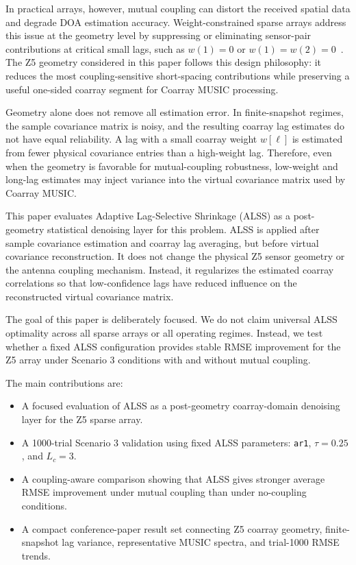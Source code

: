 \documentclass[conference]{IEEEtran}
\begin{document}
In practical arrays, however, mutual coupling can distort the received spatial data and degrade DOA estimation accuracy. Weight-constrained sparse arrays address this issue at the geometry level by suppressing or eliminating sensor-pair contributions at critical small lags, such as $w(1)=0$ or $w(1)=w(2)=0$~\cite{kulkarni2024wcsa}. The Z5 geometry considered in this paper follows this design philosophy: it reduces the most coupling-sensitive short-spacing contributions while preserving a useful one-sided coarray segment for Coarray MUSIC processing.

Geometry alone does not remove all estimation error. In finite-snapshot regimes, the sample covariance matrix is noisy, and the resulting coarray lag estimates do not have equal reliability. A lag with a small coarray weight $w[\ell]$ is estimated from fewer physical covariance entries than a high-weight lag. Therefore, even when the geometry is favorable for mutual-coupling robustness, low-weight and long-lag estimates may inject variance into the virtual covariance matrix used by Coarray MUSIC.

This paper evaluates Adaptive Lag-Selective Shrinkage (ALSS) as a post-geometry statistical denoising layer for this problem. ALSS is applied after sample covariance estimation and coarray lag averaging, but before virtual covariance reconstruction. It does not change the physical Z5 sensor geometry or the antenna coupling mechanism. Instead, it regularizes the estimated coarray correlations so that low-confidence lags have reduced influence on the reconstructed virtual covariance matrix.

The goal of this paper is deliberately focused. We do not claim universal ALSS optimality across all sparse arrays or all operating regimes. Instead, we test whether a fixed ALSS configuration provides stable RMSE improvement for the Z5 array under Scenario 3 conditions with and without mutual coupling.

The main contributions are:
\begin{itemize}
    \item A focused evaluation of ALSS as a post-geometry coarray-domain denoising layer for the Z5 sparse array.
    \item A 1000-trial Scenario 3 validation using fixed ALSS parameters: \texttt{ar1}, $\tau=0.25$, and $L_c=3$.
    \item A coupling-aware comparison showing that ALSS gives stronger average RMSE improvement under mutual coupling than under no-coupling conditions.
    \item A compact conference-paper result set connecting Z5 coarray geometry, finite-snapshot lag variance, representative MUSIC spectra, and trial-1000 RMSE trends.
\end{itemize}
\end{document}
